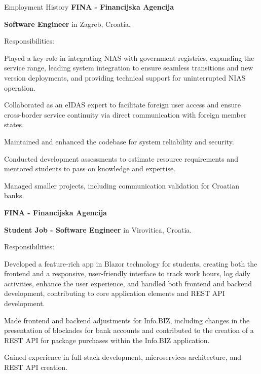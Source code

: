 \begin{rubric}{Employment History}
	\textbf{FINA - Financijska Agencija} \par
	\textbf{Software Engineer} in Zagreb, Croatia.
	\par Responsibilities:
	\begin{list}{}{\leftmargin=0pt \itemindent=1em}
		\item Played a key role in integrating NIAS with government registries, expanding the service range, leading system integration to ensure seamless transitions and new version deployments, and providing technical support for uninterrupted NIAS operation.
		\item Collaborated as an eIDAS expert to facilitate foreign user access and ensure cross-border service continuity via direct communication with foreign member states.
		\item Maintained and enhanced the codebase for system reliability and security.
		\item Conducted development assessments to estimate resource requirements and mentored students to pass on knowledge and expertise.
		\item Managed smaller projects, including communication validation for Croatian banks.
	\end{list}
	\textbf{FINA - Financijska Agencija} \par
	\textbf{Student Job - Software Engineer} in Virovitica, Croatia.
	\par Responsibilities:
	\begin{list}{}{\leftmargin=0pt \itemindent=1em}
		\item Developed a feature-rich app in Blazor technology for students, creating both the frontend and a responsive, user-friendly interface to track work hours, log daily activities, enhance the user experience, and handled both frontend and backend development, contributing to core application elements and REST API development.
		\item Made frontend and backend adjustments for Info.BIZ, including changes in the presentation of blockades for bank accounts and contributed to the creation of a REST API for package purchases within the Info.BIZ application.
		\item Gained experience in full-stack development, microservices architecture, and REST API creation.
	\end{list}
\end{rubric}